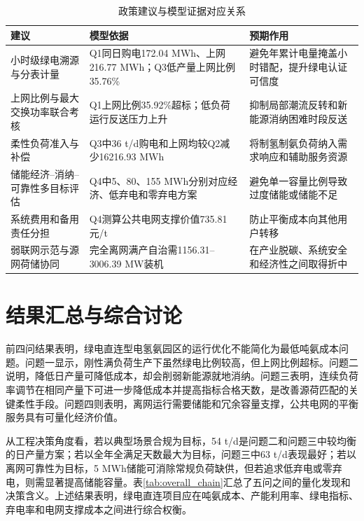 \documentclass[UTF8,a4paper,12pt]{ctexart}
\begin{document}
\begin{table}[H]
\centering
\caption{政策建议与模型证据对应关系}
\label{tab:policy_recommendation_matrix}
\scriptsize
\begin{tabular}{>{\raggedright\arraybackslash}p{}>{\raggedright\arraybackslash}p{}>{\raggedright\arraybackslash}p{}}
\toprule
建议 & 模型依据 & 预期作用\\
\midrule
小时级绿电溯源与分表计量 & Q1同日购电172.04 MWh、上网216.77 MWh；Q3低产量上网比例35.76\% & 避免年累计电量掩盖小时错配，提升绿电认证可信度\\
上网比例与最大交换功率联合考核 & Q1上网比例35.92\%超标；低负荷运行反送压力上升 & 抑制局部潮流反转和新能源消纳困难时段反送\\
柔性负荷准入与补偿 & Q3中36 t/d购电和上网均较Q2减少16216.93 MWh & 将制氢制氨负荷纳入需求响应和辅助服务资源\\
储能经济--消纳--可靠性多目标评估 & Q4中5、80、155 MWh分别对应经济、低弃电和零弃电方案 & 避免单一容量比例导致过度储能或储能不足\\
系统费用和备用责任分担 & Q4测算公共电网支撑价值735.81元/t & 防止平衡成本向其他用户转移\\
弱联网示范与源网荷储协同 & 完全离网满产自治需1156.31--3006.39 MW装机 & 在产业脱碳、系统安全和经济性之间取得折中\\
\bottomrule
\end{tabular}
\end{table}

\section{结果汇总与综合讨论}

前四问结果表明，绿电直连型电氢氨园区的运行优化不能简化为最低吨氨成本问题。问题一显示，刚性满负荷生产下虽然绿电比例较高，但上网比例超标。问题二说明，降低日产量可降低成本，却会削弱新能源就地消纳。问题三表明，连续负荷率调节在相同产量下可进一步降低成本并提高指标合格天数，是改善源荷匹配的关键柔性手段。问题四则表明，离网运行需要储能和冗余容量支撑，公共电网的平衡服务具有可量化经济价值。

从工程决策角度看，若以典型场景合规为目标，54 t/d是问题二和问题三中较均衡的日产量方案；若以全年全满足天数最大为目标，问题三中63 t/d表现最好；若以离网可靠性为目标，5 MWh储能可消除常规负荷缺供，但若追求低弃电或零弃电，则需显著提高储能容量。表\ref{tab:overall_chain}汇总了五问之间的量化发现和决策含义。上述结果表明，绿电直连项目应在吨氨成本、产能利用率、绿电指标、弃电率和电网支撑成本之间进行综合权衡。
\end{document}

